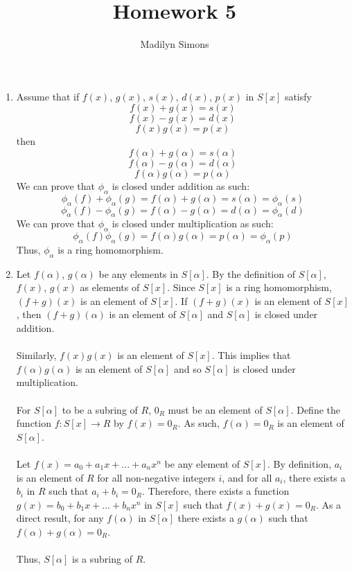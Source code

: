 \documentclass{article}
\title{Homework 5}
\author{Madilyn Simons}
\date{}
\begin{document}
\maketitle

\begin{enumerate}

\item Assume that if $f(x)$, $g(x)$, $s(x)$, $d(x)$, $p(x)$ in $S[x]$ satisfy
\[
f(x) + g(x) = s(x)
\] \[
f(x) - g(x) = d(x)
\] \[
f(x)g(x) = p(x)
\]
then
\[
\] \[
f(\alpha) + g(\alpha) = s(\alpha)
\] \[
f(\alpha) - g(\alpha) = d(\alpha)
\] \[
f(\alpha)g(\alpha) = p(\alpha)
\]
We can prove that $\phi_{\alpha}$ is closed under addition as such:
\[
\phi_{\alpha}(f) + \phi_{\alpha}(g) = f(\alpha) + g(\alpha) = s(\alpha) = \phi_{\alpha}(s)
\] \[
\phi_{\alpha}(f) - \phi_{\alpha}(g) = f(\alpha) - g(\alpha) = d(\alpha) = \phi_{\alpha}(d)
\]
We can prove that $\phi_{\alpha}$ is closed under multiplication as such:
\[
\phi_{\alpha}(f)\phi_{\alpha}(g) = f(\alpha)g(\alpha) = p(\alpha) = \phi_{\alpha}(p)
\]
Thus, $\phi_{\alpha}$ is a ring homomorphism.

\item Let $f(\alpha)$, $g(\alpha)$ be any elements in $S[\alpha]$.  By the
definition of $S[\alpha]$, $f(x)$, $g(x)$ as elements of $S[x]$.  Since $S[x]$
is a ring homomorphism, $(f+g)(x)$ is an element of $S[x]$.  If $(f+g)(x)$ is an
element of $S[x]$, then $(f+g)(\alpha)$ is an element of $S[\alpha]$ and
$S[\alpha]$ is closed under addition.
\\
\\
Similarly, $f(x)g(x)$ is an element of $S[x]$.  This implies that
$f(\alpha)g(\alpha)$ is an element of $S[\alpha]$ and so $S[\alpha]$ is
closed under multiplication.
\\
\\
For $S[\alpha]$ to be a subring of $R$, $0_R$ must be an element of $S[\alpha]$.
Define the function $f:S[x] \rightarrow R$ by $f(x) = 0_R$.  As such,
$f(\alpha) = 0_R$ is an element of $S[\alpha]$.
\\
\\
Let $f(x) = a_0 + a_{1}x + ... + a_{n}x^n$ be any element of $S[x]$.
By definition, $a_i$ is an element of $R$ for all non-negative integers $i$, and
for all $a_i$, there exists a $b_i$ in $R$ such that $a_i + b_i = 0_R$.
Therefore, there exists a function $g(x) = b_0 + b_{1}x + ... + b_{n}x^n$ in
$S[x]$ such that $f(x) + g(x) = 0_R$.  As a direct result, for any $f(\alpha)$
in $S[\alpha]$ there exists a $g(\alpha)$ such that
$f(\alpha) + g(\alpha) = 0_R$.
\\
\\
Thus, $S[\alpha]$ is a subring of $R$.


\end{enumerate}
\end{document}
